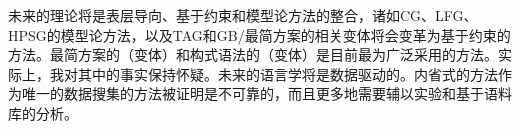 未来的理论将是表层导向、基于约束和模型论方法的整合，诸如CG\indexcgc、LFG\indexlfgc、HPSG\indexcxgc 的模型论方法，以及TAG\indextagc 和GB/最简方案\indexgbc \indexmpc 的相关变体将会变革为基于约束的方法。最简方案的（变体）和构式语法的（变体）是目前最为广泛采用的方法。实际上，我对其中的事实保持怀疑。未来的语言学将是数据驱动的。内省式的方法作为唯一的数据搜集的方法被证明是不可靠的\citep{Mueller2007c,MM2009a}，而且更多地需要辅以实验和基于语料库的分析。

